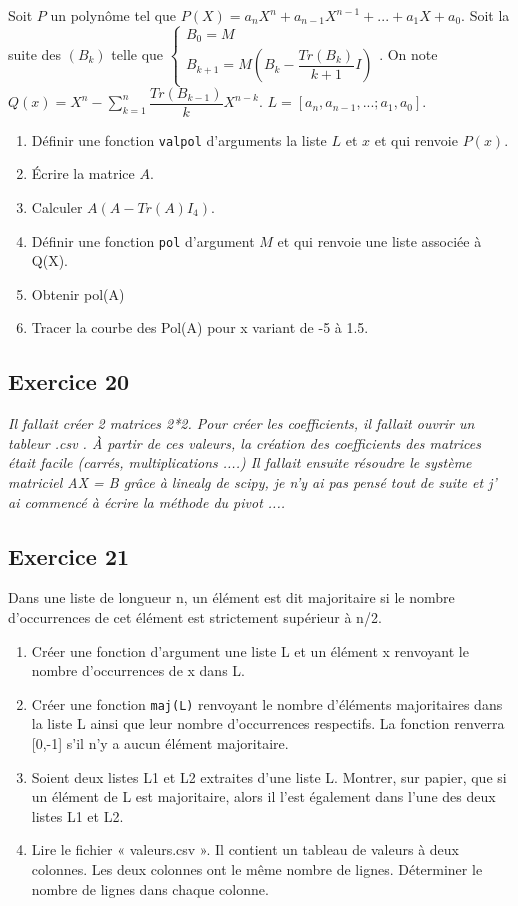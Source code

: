 \documentclass[10pt,fleqn]{article} %
\begin{document}
\begin{multicols}{2}
Soit $P$ un polynôme tel que $P(X)=a_n X^n + a_{n-1}X^{n-1} + ... + a_1 X + a_0$. Soit la suite des $(B_k)$ telle que $\left\{ \begin{array}{c} B_0 = M \\ B_{k+1} = M\left( B_k - \dfrac{Tr(B_k)}{k+1} I\right)\end{array}\right.$. On note $Q(x)=X^n - \sum \limits^n_{k=1}  \dfrac{Tr(B_{k-1})}{k}X^{n-k}$. $L=[a_n,a_{n-1},...;a_1,a_0]$.

\begin{enumerate}
\item Définir une fonction \texttt{valpol} d’arguments la liste $L$ et $x$ et qui renvoie $P(x)$. 
\item Écrire la matrice $A$.
\item Calculer $A(A-Tr(A)I_4)$.
\item Définir une fonction \texttt{pol} d’argument $M$ et qui renvoie une liste associée à Q(X).
\item Obtenir pol(A)
\item Tracer la courbe des Pol(A) pour x variant de -5 à 1.5.
\end{enumerate}


\subsection*{Exercice 20}
\textit{
Il fallait créer 2 matrices 2*2.
Pour créer les coefficients, il fallait ouvrir un tableur .csv .
À partir de ces valeurs, la création des coefficients des matrices était facile (carrés, multiplications ....)
Il fallait ensuite résoudre le système matriciel AX = B grâce à linealg de scipy, je n'y ai pas pensé tout de suite et j' ai commencé à écrire la méthode du pivot ....}


\subsection*{Exercice 21}

Dans une liste de longueur n, un élément est dit majoritaire si le nombre d’occurrences de cet élément est strictement supérieur à n/2.
\begin{enumerate}
\item Créer une fonction d’argument une liste L et un élément x renvoyant le nombre d’occurrences de x dans L.
\item Créer une fonction \texttt{maj(L)} renvoyant le nombre d’éléments majoritaires dans la liste L ainsi que leur nombre d’occurrences respectifs. La fonction renverra [0,-1] s’il n’y a aucun élément majoritaire.
\item Soient deux listes L1 et L2 extraites d’une liste L. Montrer, sur papier, que si un élément de L est majoritaire, alors il l’est également dans l’une des deux listes L1 et L2.
\item  Lire le fichier  « valeurs.csv ». Il contient un tableau de valeurs à deux colonnes. Les deux colonnes ont le même nombre de lignes. Déterminer le nombre de lignes dans chaque colonne.
\end{enumerate}




\end{multicols}
\end{document}
